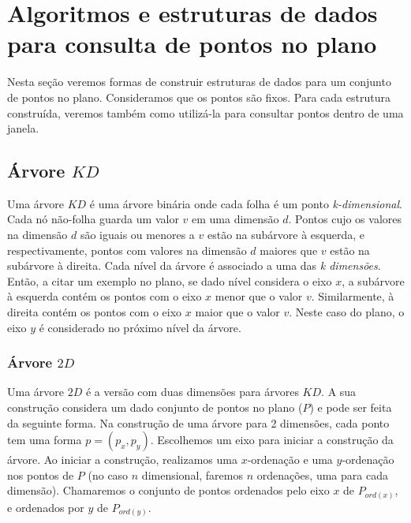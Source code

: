 \chapter{Algoritmos e estruturas de dados para consulta de pontos no plano}\label{cap:desenvolvimento}
Nesta seção veremos formas de construir estruturas de dados para um conjunto de pontos no plano. Consideramos que os pontos são fixos. Para cada estrutura construída, veremos também como utilizá-la para consultar pontos dentro de uma janela.

\section{Árvore $KD$}

Uma árvore $KD$ \cite{bentley1975multidimensional} é uma árvore binária onde cada folha é um ponto \textit{k-dimensional}.
Cada nó não-folha guarda um valor $v$ em uma dimensão $d$. Pontos cujo os valores na dimensão $d$ são iguais ou menores a $v$ estão na subárvore à esquerda, e respectivamente, pontos com valores na dimensão $d$ maiores que $v$ estão na subárvore à direita. Cada nível da árvore é associado a uma das \textit{k dimensões}. Então, a citar um exemplo no plano,
se dado nível considera o eixo $x$, a subárvore à esquerda contém os pontos com o eixo $x$ menor que o valor $v$. Similarmente, à direita contém os pontos com o eixo $x$ maior que o valor $v$. Neste caso do plano, o eixo $y$ é considerado no próximo nível da árvore.

\subsection{Árvore $2D$}
Uma árvore $2D$ é a versão com duas dimensões para árvores $KD$. A sua construção considera um dado conjunto de pontos no plano ($P$) e pode ser feita da seguinte forma. Na construção de uma árvore para 2 dimensões, cada ponto tem uma forma $p = (p_x, p_y)$. Escolhemos um eixo para iniciar a construção da árvore. Ao iniciar a construção, realizamos     uma $x$-ordenação e uma $y$-ordenação nos pontos de $P$ (no caso $n$ dimensional, faremos $n$ ordenações, uma para cada dimensão). Chamaremos o conjunto de pontos ordenados pelo eixo $x$ de $P_{ord(x)}$, e ordenados por $y$ de $P_{ord(y)}$.

